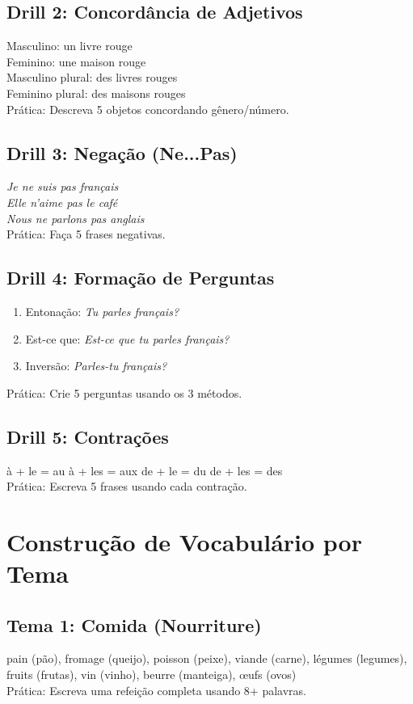 \documentclass[a4paper,12pt]{article}
\begin{document}
\subsection{Drill 2: Concordância de Adjetivos}
Masculino: un livre rouge \\
Feminino: une maison rouge \\
Masculino plural: des livres rouges \\
Feminino plural: des maisons rouges \\
Prática: Descreva 5 objetos concordando gênero/número.

\subsection{Drill 3: Negação (Ne...Pas)}
\emph{Je ne suis pas français} \\
\emph{Elle n’aime pas le café} \\
\emph{Nous ne parlons pas anglais} \\
Prática: Faça 5 frases negativas.

\subsection{Drill 4: Formação de Perguntas}
\begin{enumerate}
    \item Entonação: \emph{Tu parles français?}
    \item Est-ce que: \emph{Est-ce que tu parles français?}
    \item Inversão: \emph{Parles-tu français?}
\end{enumerate}
Prática: Crie 5 perguntas usando os 3 métodos.

\subsection{Drill 5: Contrações}
à + le = au \quad à + les = aux \quad de + le = du \quad de + les = des \\
Prática: Escreva 5 frases usando cada contração.

\section{Construção de Vocabulário por Tema}
\subsection{Tema 1: Comida (Nourriture)}
pain (pão), fromage (queijo), poisson (peixe), viande (carne), légumes (legumes), fruits (frutas), vin (vinho), beurre (manteiga), œufs (ovos) \\
Prática: Escreva uma refeição completa usando 8+ palavras.
\end{document}
